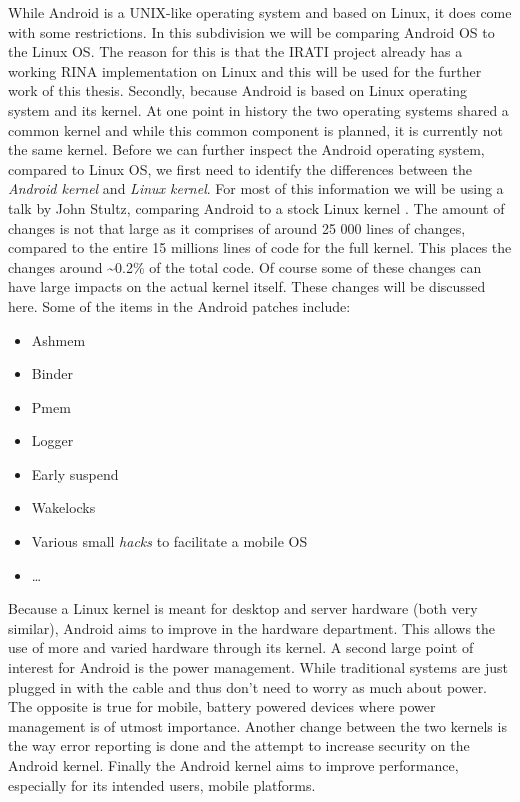 While Android is a UNIX-like operating system and based on Linux, it does come with some restrictions. In this subdivision we will be comparing Android OS to the Linux OS. The reason for this is that the IRATI project already has a working RINA implementation on Linux and this will be used for the further work of this thesis. Secondly, because Android is based on Linux operating system and its kernel. At one point in history the two operating systems shared a common kernel and while this common component is planned, it is currently not the same kernel. 
\npar
Before we can further inspect the Android operating system, compared to Linux OS, we first need to identify the differences between the \emph{Android kernel} and \emph{Linux kernel}. For most of this information we will be using a talk by John Stultz, comparing Android to a stock Linux kernel \citep{presentation:android_linux_kernel,website:android_linux_kernel}. The amount of changes is not that large as it comprises of around 25 000 lines of changes, compared to the entire 15 millions lines of code for the full kernel. This places the changes around \textasciitilde0.2\% of the total code. Of course some of these changes can have large impacts on the actual kernel itself. These changes will be discussed here. Some of the items in the Android patches include:
\begin{itemize}
	\item Ashmem
	\item Binder
	\item Pmem
	\item Logger
	\item Early suspend
	\item Wakelocks
	\item Various small \emph{hacks} to facilitate a mobile OS
	\item \ldots
\end{itemize}
Because a Linux kernel is meant for desktop and server hardware (both very similar), Android aims to improve in the hardware department. This allows the use of more and varied hardware through its kernel. A second large point of interest for Android is the power management. While traditional systems are just plugged in with the cable and thus don't need to worry as much about power. The opposite is true for mobile, battery powered devices where power management is of utmost importance. Another change between the two kernels is the way error reporting is done and the attempt to increase security on the Android kernel. Finally the Android kernel aims to improve performance, especially for its intended users, mobile platforms.
